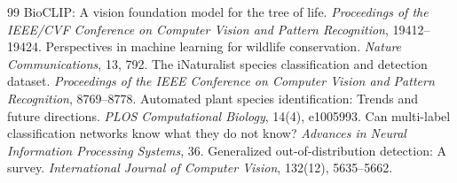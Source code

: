 \documentclass[preprint,12pt,authoryear]{elsarticle}
\begin{document}
\begin{thebibliography}{99}
 BioCLIP: A vision foundation model for the tree of life. \emph{Proceedings of the IEEE/CVF Conference on Computer Vision and Pattern Recognition}, 19412--19424.
 Perspectives in machine learning for wildlife conservation. \emph{Nature Communications}, 13, 792.
 The iNaturalist species classification and detection dataset. \emph{Proceedings of the IEEE Conference on Computer Vision and Pattern Recognition}, 8769--8778.
 Automated plant species identification: Trends and future directions. \emph{PLOS Computational Biology}, 14(4), e1005993.
 Can multi-label classification networks know what they do not know? \emph{Advances in Neural Information Processing Systems}, 36.
 Generalized out-of-distribution detection: A survey. \emph{International Journal of Computer Vision}, 132(12), 5635--5662.
\end{thebibliography}
\end{document}
